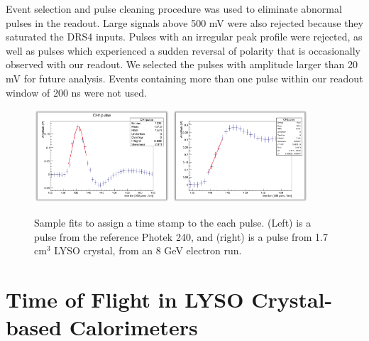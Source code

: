 \documentclass[11pt]{article}
\begin{document}
Event selection and pulse cleaning procedure was used to eliminate abnormal
pulses in the readout. Large signals above 500 mV were also rejected because
they saturated the DRS4 inputs. Pulses with an irregular peak profile were
rejected, as well as pulses which experienced a sudden reversal of polarity that
is occasionally observed with our readout. We selected the pulses with amplitude
larger than 20 mV for future analysis. Events containing more than one pulse
within our readout window of 200 ns were not used. 

\begin{figure}[h] \centering
\includegraphics[width=0.45\textwidth]{figs/RefPulseFit} 
\includegraphics[width=0.45\textwidth]{figs/ScintPulseFit} 
\caption{Sample fits to assign a time stamp to the each pulse. (Left) is a  pulse from the reference Photek 240, and (right) is a  pulse from 1.7 cm$^3$ LYSO crystal, from an 8 GeV electron run.} 
\label{fig:PulseFits}
\end{figure}


\section{Time of Flight in LYSO Crystal-based Calorimeters}
\end{document}
